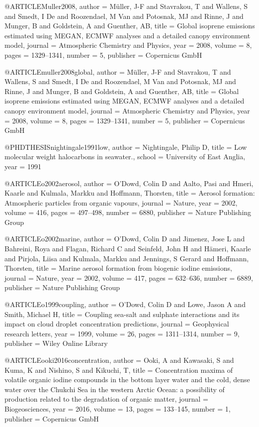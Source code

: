 @ARTICLE{Muller2008,
  author = {M{\"u}ller, J-F and Stavrakou, T and Wallens, S and Smedt, I De and
	Roozendael, M Van and Potosnak, MJ and Rinne, J and Munger, B and
	Goldstein, A and Guenther, AB},
  title = {Global isoprene emissions estimated using MEGAN, ECMWF analyses and
	a detailed canopy environment model},
  journal = {Atmospheric Chemistry and Physics},
  year = {2008},
  volume = {8},
  pages = {1329--1341},
  number = {5},
  publisher = {Copernicus GmbH}
}

@ARTICLE{muller2008global,
  author = {M{\"u}ller, J-F and Stavrakou, T and Wallens, S and Smedt, I De and
	Roozendael, M Van and Potosnak, MJ and Rinne, J and Munger, B and
	Goldstein, A and Guenther, AB},
  title = {Global isoprene emissions estimated using MEGAN, ECMWF analyses and
	a detailed canopy environment model},
  journal = {Atmospheric Chemistry and Physics},
  year = {2008},
  volume = {8},
  pages = {1329--1341},
  number = {5},
  publisher = {Copernicus GmbH}
}

@PHDTHESIS{nightingale1991low,
  author = {Nightingale, Philip D},
  title = {Low molecular weight halocarbons in seawater.},
  school = {University of East Anglia},
  year = {1991}
}

@ARTICLE{o2002aerosol,
  author = {O'Dowd, Colin D and Aalto, Pasi and Hmeri, Kaarle and Kulmala, Markku
	and Hoffmann, Thorsten},
  title = {Aerosol formation: Atmospheric particles from organic vapours},
  journal = {Nature},
  year = {2002},
  volume = {416},
  pages = {497--498},
  number = {6880},
  publisher = {Nature Publishing Group}
}

@ARTICLE{o2002marine,
  author = {O'Dowd, Colin D and Jimenez, Jose L and Bahreini, Roya and Flagan,
	Richard C and Seinfeld, John H and H{\"a}meri, Kaarle and Pirjola,
	Liisa and Kulmala, Markku and Jennings, S Gerard and Hoffmann, Thorsten},
  title = {Marine aerosol formation from biogenic iodine emissions},
  journal = {Nature},
  year = {2002},
  volume = {417},
  pages = {632--636},
  number = {6889},
  publisher = {Nature Publishing Group}
}

@ARTICLE{o1999coupling,
  author = {O'Dowd, Colin D and Lowe, Jason A and Smith, Michael H},
  title = {Coupling sea-salt and sulphate interactions and its impact on cloud
	droplet concentration predictions},
  journal = {Geophysical research letters},
  year = {1999},
  volume = {26},
  pages = {1311--1314},
  number = {9},
  publisher = {Wiley Online Library}
}

@ARTICLE{ooki2016concentration,
  author = {Ooki, A and Kawasaki, S and Kuma, K and Nishino, S and Kikuchi, T},
  title = {Concentration maxima of volatile organic iodine compounds in the
	bottom layer water and the cold, dense water over the Chukchi Sea
	in the western Arctic Ocean: a possibility of production related
	to the degradation of organic matter},
  journal = {Biogeosciences},
  year = {2016},
  volume = {13},
  pages = {133--145},
  number = {1},
  publisher = {Copernicus GmbH}
}

